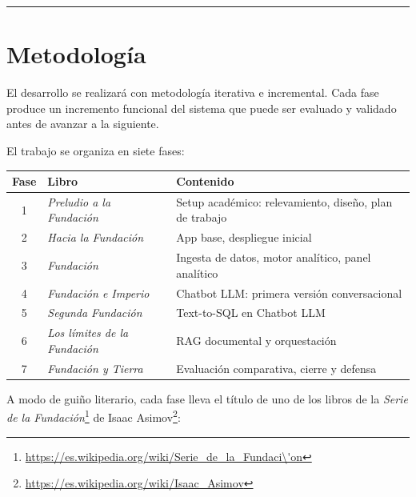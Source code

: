 \documentclass[
  spanish,
]{article}
\begin{document}
\begin{center}\rule{0.5\linewidth}{0.5pt}\end{center}

\section{Metodología}\label{metodologuxeda}

El desarrollo se realizará con metodología iterativa e incremental. Cada
fase produce un incremento funcional del sistema que puede ser evaluado
y validado antes de avanzar a la siguiente.

El trabajo se organiza en siete fases:

\begin{center}
{\renewcommand{\arraystretch}{1.2}
\begin{tabular}{@{}cll@{}}
\toprule
\textbf{Fase} & \textbf{Libro} & \textbf{Contenido} \\
\midrule
1 & \emph{Preludio a la Fundación}     & Setup académico: relevamiento, diseño, plan de trabajo \\
2 & \emph{Hacia la Fundación}          & App base, despliegue inicial \\
3 & \emph{Fundación}                   & Ingesta de datos, motor analítico, panel analítico \\
4 & \emph{Fundación e Imperio}         & Chatbot LLM: primera versión conversacional \\
5 & \emph{Segunda Fundación}           & Text-to-SQL en Chatbot LLM \\
6 & \emph{Los límites de la Fundación} & RAG documental y orquestación \\
7 & \emph{Fundación y Tierra}          & Evaluación comparativa, cierre y defensa \\
\bottomrule
\end{tabular}}
\end{center}

A modo de guiño literario,
cada fase lleva el título de uno de los libros de la
\emph{Serie de la Fundación}\footnote{\url{https://es.wikipedia.org/wiki/Serie_de_la_Fundaci\'on}}
de Isaac Asimov\footnote{\url{https://es.wikipedia.org/wiki/Isaac_Asimov}}:
\end{document}
